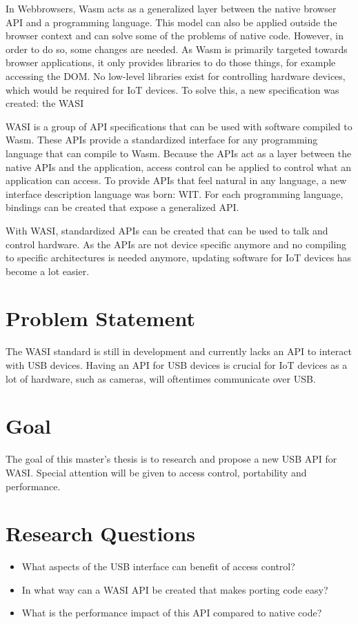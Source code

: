 In Webbrowsers, \acrfull{Wasm} acts as a generalized layer between the native browser API and a programming language. This model can also be applied outside the browser context and can solve some of the problems of native code. However, in order to do so, some changes are needed. As \acrshort{Wasm} is primarily targeted towards browser applications, it only provides libraries to do those things, for example accessing the DOM. No low-level libraries exist for controlling hardware devices, which would be required for \acrshort{IoT} devices. To solve this, a new specification was created: the \acrfull{WASI}

\acrshort{WASI} is a group of API specifications that can be used with software compiled to \acrshort{Wasm}. These APIs provide a standardized interface for any programming language that can compile to \acrshort{Wasm}. Because the APIs act as a layer between the native APIs and the application, access control can be applied to control what an application can access. To provide APIs that feel natural in any language, a new interface description language was born: \acrfull{WIT}. For each programming language, bindings can be created that expose a generalized API.

With \acrshort{WASI}, standardized APIs can be created that can be used to talk and control hardware. As the APIs are not device specific anymore and no compiling to specific architectures is needed anymore, updating software for \acrshort{IoT} devices has become a lot easier.

\section*{Problem Statement}

The \acrshort{WASI} standard is still in development and currently lacks an API to interact with USB devices. Having an API for USB devices is crucial for \acrshort{IoT} devices as a lot of hardware, such as cameras, will oftentimes communicate over USB.

\section*{Goal}

The goal of this master's thesis is to research and propose a new USB API for \acrshort{WASI}. Special attention will be given to access control, portability and performance.

\section*{Research Questions}

\begin{itemize}

\item What aspects of the USB interface can benefit of access control?

\item In what way can a WASI API be created that makes porting code easy?

\item What is the performance impact of this API compared to native code?

\end{itemize}

